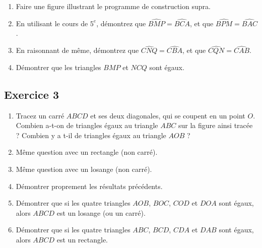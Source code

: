 \documentclass[12 pt]{extarticle}
\theoremstyle{plain}
\begin{document}
 \begin{enumerate}
 \item Faire une figure illustrant le programme de construction supra. 
 \item En utilisant le cours de $5^e$, démontrez que $\widehat{BMP}=\widehat{BCA}$, et que $\widehat{BPM}= \widehat{BAC}$. 
 \item En raisonnant de même, démontrez que $\widehat{CNQ}=\widehat{CBA}$, et que $\widehat{CQN}= \widehat{CAB}$. 
 \item Démontrer que les triangles $BMP$ et $NCQ$ sont égaux. 
 \end{enumerate}
 
\subsection*{Exercice 3}
 
 \begin{enumerate}
 
 \item Tracez un carré $ABCD$ et ses deux diagonales, qui se coupent en un point $O$. Combien a-t-on de triangles égaux au triangle $ABC$ sur la figure ainsi tracée ? Combien y a t-il de triangles égaux au triangle $AOB$ ? 
  
\item Même question avec un rectangle (non carré). 
 
 \item Même question avec un losange (non carré). 

\item Démontrer proprement les résultats précédents. 

\item Démontrer que si les quatre triangles $AOB$, $BOC$, $COD$ et $DOA$ sont égaux, alors $ABCD$ est un losange (ou un carré). 

\item Démontrer que si les quatre triangles $ABC$, $BCD$, $CDA$ et $DAB$ sont égaux, alors $ABCD$ est un rectangle. 
\end{enumerate}



 
 	
\end{document}
